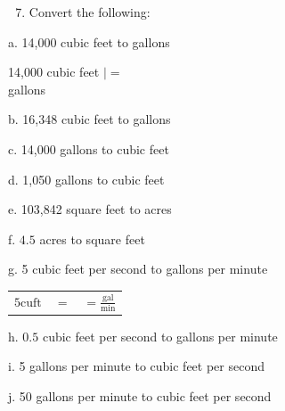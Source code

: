 \documentclass[10pt]{article}
\begin{document}
\begin{enumerate}
  \setcounter{enumi}{6}
  \item Convert the following:
\end{enumerate}
a. 14,000 cubic feet to gallons

14,000 cubic feet $\mid=$\\
gallons

b. 16,348 cubic feet to gallons

c. 14,000 gallons to cubic feet

d. 1,050 gallons to cubic feet

e. 103,842 square feet to acres

f. $4.5$ acres to square feet

g. 5 cubic feet per second to gallons per minute

\begin{tabular}{l|l|l}
$5 \mathrm{cuft}$ & $=$ & $=\frac{\mathrm{gal}}{\mathrm{min}}$ \\
\end{tabular}

h. $0.5$ cubic feet per second to gallons per minute

i. 5 gallons per minute to cubic feet per second

j. 50 gallons per minute to cubic feet per second
\end{document}
